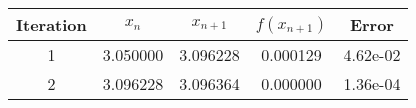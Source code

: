 \begin{tabular}{|c|c|c|c|c|}
\hline
Iteration & $x_n$ & $x_{n+1}$ & $f(x_{n+1})$ & Error \\
\hline
1 & 3.050000 & 3.096228 & 0.000129 & 4.62e-02 \\
\hline
2 & 3.096228 & 3.096364 & 0.000000 & 1.36e-04 \\
\hline
\end{tabular}